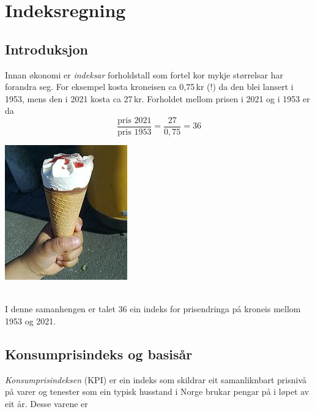 




\newpage
\section{Indeksregning}
\subsection{Introduksjon}
\parbox{0.6\linewidth}{Innan økonomi er \textit{indeksar} forholdstall som fortel kor mykje størrelsar har forandra seg. For eksempel kosta kroneisen ca 0,75\,kr (!) da den blei lansert i 1953, mens den i 2021 kosta ca 27\,kr. Forholdet mellom prisen i 2021 og i 1953 er da
	\[ \frac{\text{pris 2021}}{\text{pris 1953}}=\frac{27}{0,75}= 36 \]
}
\parbox[r]{0.3\linewidth}{\includegraphics[scale=2]{kr}}\\[2pt]
I denne samanhengen er talet 36 ein indeks for prisendringa på kroneis mellom 1953 og 2021.

\subsection{Konsumprisindeks og basisår}
\textit{Konsumprisindeksen} (KPI) er ein indeks som skildrar eit samanliknbart prisnivå på varer og tenester som ein typisk husstand i Norge brukar pengar på i løpet av eit år. Desse varene er \vs

